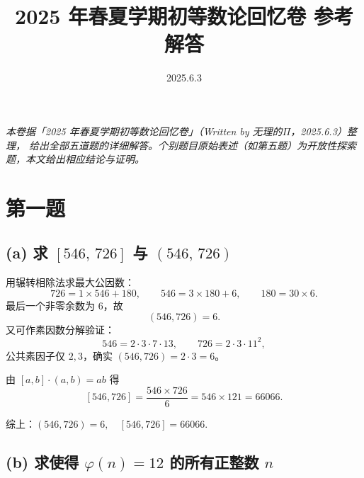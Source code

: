 \documentclass{article}
\title{\textbf{2025 年春夏学期初等数论回忆卷 \quad 参考解答}}
\author{}
\date{2025.6.3}
\begin{document}
\maketitle

\begin{center}
\itshape 本卷据「2025 年春夏学期初等数论回忆卷」（Written by 无理的$\Pi$，2025.6.3）整理，
给出全部五道题的详细解答。个别题目原始表述（如第五题）为开放性探索题，本文给出相应结论与证明。
\end{center}

\bigskip

\section{第一题}

\subsection*{(a) 求 $[546,\,726]$ 与 $(546,\,726)$}

\begin{solution}
用辗转相除法求最大公因数：
\[
  726 = 1\times 546 + 180,\qquad
  546 = 3\times 180 + 6,\qquad
  180 = 30\times 6.
\]
最后一个非零余数为 $6$，故
\[
  (546,726)=6.
\]
又可作素因数分解验证：
\[
  546 = 2\cdot 3\cdot 7\cdot 13,\qquad
  726 = 2\cdot 3\cdot 11^{2},
\]
公共素因子仅 $2,3$，确实 $(546,726)=2\cdot 3=6$。

由 $[a,b]\cdot(a,b)=ab$ 得
\[
  [546,726]=\frac{546\times 726}{6}=546\times 121=66066.
\]

\medskip\noindent
综上：$\boxed{(546,726)=6,\quad [546,726]=66066.}$
\end{solution}

\subsection*{(b) 求使得 $\varphi(n)=12$ 的所有正整数 $n$}
\end{document}
